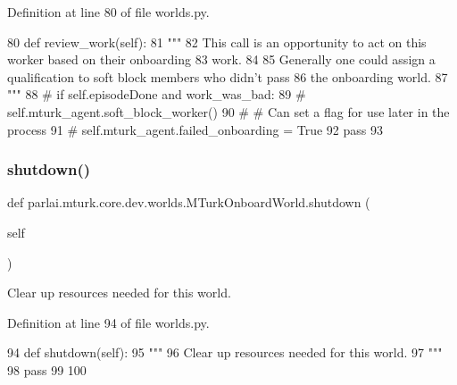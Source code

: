 Definition at line 80 of file worlds.\+py.


\begin{DoxyCode}
80     \textcolor{keyword}{def }review\_work(self):
81         \textcolor{stringliteral}{"""}
82 \textcolor{stringliteral}{        This call is an opportunity to act on this worker based on their onboarding}
83 \textcolor{stringliteral}{        work.}
84 \textcolor{stringliteral}{}
85 \textcolor{stringliteral}{        Generally one could assign a qualification to soft block members who didn't pass}
86 \textcolor{stringliteral}{        the onboarding world.}
87 \textcolor{stringliteral}{        """}
88         \textcolor{comment}{# if self.episodeDone and work\_was\_bad:}
89         \textcolor{comment}{#   self.mturk\_agent.soft\_block\_worker()}
90         \textcolor{comment}{#   # Can set a flag for use later in the process}
91         \textcolor{comment}{#   self.mturk\_agent.failed\_onboarding = True}
92         \textcolor{keywordflow}{pass}
93 
\end{DoxyCode}
\mbox{\label{classparlai_1_1mturk_1_1core_1_1dev_1_1worlds_1_1MTurkOnboardWorld_af9d88a4a66544105982cce3de87ad0c0}} 
\subsubsection{\texorpdfstring{shutdown()}{shutdown()}}
{\footnotesize\ttfamily def parlai.\+mturk.\+core.\+dev.\+worlds.\+M\+Turk\+Onboard\+World.\+shutdown (\begin{DoxyParamCaption}\item[{}]{self }\end{DoxyParamCaption})}

\begin{DoxyVerb}Clear up resources needed for this world.
\end{DoxyVerb}
 

Definition at line 94 of file worlds.\+py.


\begin{DoxyCode}
94     \textcolor{keyword}{def }shutdown(self):
95         \textcolor{stringliteral}{"""}
96 \textcolor{stringliteral}{        Clear up resources needed for this world.}
97 \textcolor{stringliteral}{        """}
98         \textcolor{keywordflow}{pass}
99 
100 
\end{DoxyCode}


